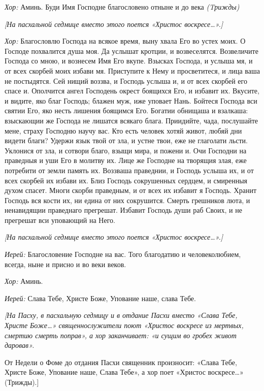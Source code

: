 \begin{mymulticols}
{\itshape Хор:} Аминь. Буди Имя Господне благословено отныне и до века {\itshape (Tрижды)}

{\itshape [На пасхальной седмице вместо этого поется «Христос воскресе…».]}


{\itshape Хор:} Благословлю Господа на всякое время, выну хвала Его во устех моих. О Господе похвалится душа моя. Да услышат кротции, и возвеселятся. Возвеличите Господа со мною, и вознесем Имя Его вкупе. Взысках Господа, и услыша мя, и от всех скорбей моих избави мя. Приступите к Нему и просветитеся, и лица ваша не постыдятся. Сей нищий воззва, и Господь услыша и, и от всех скорбей его спасе и. Ополчится ангел Господень окрест боящихся Его, и избавит их. Вкусите, и видите, яко благ Господь; блажен муж, иже уповает Нань. Бойтеся Господа вси святии Его, яко несть лишения боящимся Его. Богатии обнищаша и взалкаша: взыскающии же Господа не лишатся всякаго блага. Приидийте, чада, послушайте мене, страху Господню научу вас. Кто есть человек хотяй живот, любяй дни видети благи? Удержи язык твой от зла, и устне твои, еже не глаголати льсти. Уклонися от зла, и сотвори благо, взыщи мира, и пожени и. Очи Господни на праведныя и уши Его в молитву их. Лице же Господне на творящия злая, еже потребити от земли память их. Воззваша праведнии, и Господь услыша их, и от всех скорбей их избави их. Близ Господь сокрушенных сердцем, и смиренныя духом спасет. Многи скорби праведным, и от всех их избавит я Господь. Хранит Господь вся кости их, ни едина от них сокрушится. Смерть грешников люта, и ненавидящии праведнаго прегрешат. Избавит Господь души раб Своих, и не прегрешат вси уповающий на Него.

{\itshape [На пасхальной седмице вместо этого поется «Христос воскресе…».]}

{\itshape Иерей:} Благословение Господне на вас. Того благодатию и человеколюбием, всегда, ныне и присно и во веки веков.

{\itshape Хор:} Аминь.

{\itshape Иерей:} Слава Тебе, Христе Боже, Упование наше, слава Тебе.

{\itshape[На Пасху, в пасхальную седмицу и в отдание Пасхи вместо «Слава Тебе, Христе Боже…» священнослужители поют «Христос воскресе из мертвых, смертию смерть поправ», а хор заканчивает: «и сущим во гробех живот даровав». 

От Недели о Фоме до отдания Пасхи священник произносит: «Слава Тебе, Христе Боже, Упование наше, Слава Тебе», а хор поет «Христос воскресе…» (Трижды).]}


\end{mymulticols}
